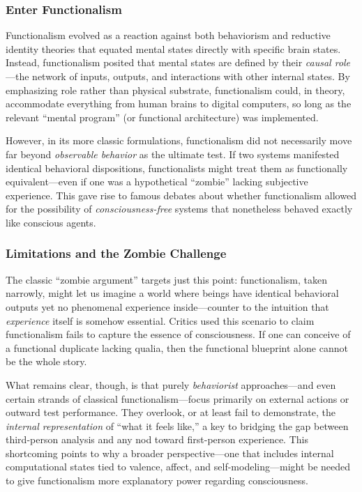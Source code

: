 \documentclass[12pt]{article}
\begin{document}
\subsubsection{Enter Functionalism}

Functionalism evolved as a reaction against both behaviorism and reductive identity theories that equated mental states directly with specific brain states. Instead, functionalism posited that mental states are defined by their \textit{causal role}---the network of inputs, outputs, and interactions with other internal states. By emphasizing role rather than physical substrate, functionalism could, in theory, accommodate everything from human brains to digital computers, so long as the relevant ``mental program'' (or functional architecture) was implemented.

However, in its more classic formulations, functionalism did not necessarily move far beyond \textit{observable behavior} as the ultimate test. If two systems manifested identical behavioral dispositions, functionalists might treat them as functionally equivalent---even if one was a hypothetical ``zombie'' lacking subjective experience. This gave rise to famous debates about whether functionalism allowed for the possibility of \textit{consciousness-free} systems that nonetheless behaved exactly like conscious agents.

\subsubsection{Limitations and the Zombie Challenge}

The classic ``zombie argument'' targets just this point: functionalism, taken narrowly, might let us imagine a world where beings have identical behavioral outputs yet no phenomenal experience inside---counter to the intuition that \textit{experience} itself is somehow essential. Critics used this scenario to claim functionalism fails to capture the essence of consciousness. If one can conceive of a functional duplicate lacking qualia, then the functional blueprint alone cannot be the whole story.

What remains clear, though, is that purely \textit{behaviorist} approaches---and even certain strands of classical functionalism---focus primarily on external actions or outward test performance. They overlook, or at least fail to demonstrate, the \textit{internal representation} of ``what it feels like,'' a key to bridging the gap between third-person analysis and any nod toward first-person experience. This shortcoming points to why a broader perspective---one that includes internal computational states tied to valence, affect, and self-modeling---might be needed to give functionalism more explanatory power regarding consciousness.
\end{document}
